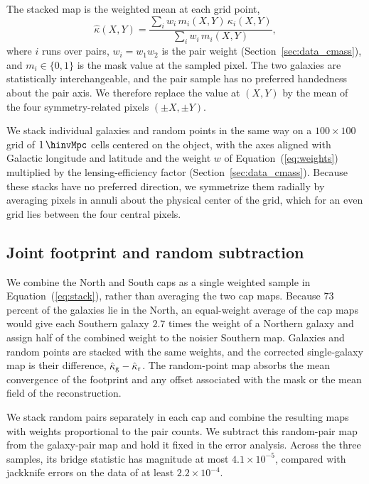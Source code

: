 The stacked map is the weighted mean at each grid point,
\begin{equation}
  \hat\kappa(X,Y) = \frac{\sum_{i} w_{i}\,m_{i}(X,Y)\,\kappa_{i}(X,Y)}
                         {\sum_{i} w_{i}\,m_{i}(X,Y)},
  \label{eq:stack}
\end{equation}
where $i$ runs over pairs, $w_{i}=w_{1}w_{2}$ is the pair weight
(Section~\ref{sec:data_cmass}), and $m_{i}\in\{0,1\}$ is the mask value at
the sampled pixel. The two galaxies are statistically interchangeable, and
the pair sample has no preferred handedness about the pair axis. We therefore
replace the value at $(X,Y)$ by the mean of the four symmetry-related pixels
$(\pm X,\pm Y)$.

We stack individual galaxies and random points in the same way on a
$100\times100$ grid of $1\,\hinvMpc$ cells centered on the object, with the
axes aligned with Galactic longitude and latitude and the weight $w$ of
Equation~(\ref{eq:weights}) multiplied by the lensing-efficiency factor
(Section~\ref{sec:data_cmass}). Because these stacks have no preferred
direction, we symmetrize them radially by averaging pixels in annuli about
the physical center of the grid, which for an even grid lies between the
four central pixels.

\subsection{Joint footprint and random subtraction}
\label{sec:joint}

We combine the North and South caps as a single weighted sample in
Equation~(\ref{eq:stack}), rather than averaging the two cap maps. Because
$73$ percent of the galaxies lie in the North, an equal-weight average of the
cap maps would give each Southern galaxy $2.7$ times the weight of a Northern
galaxy and assign half of the combined weight to the noisier Southern map.
Galaxies and random points are stacked with the same weights, and the
corrected single-galaxy map is their difference,
$\hat\kappa_{\rm g}-\hat\kappa_{\rm r}$. The random-point map absorbs the
mean convergence of the footprint and any offset associated with the mask
or the mean field of the reconstruction.

We stack random pairs separately in each cap and combine the resulting maps
with weights proportional to the pair counts. We subtract this random-pair
map from the galaxy-pair map and hold it fixed in the error analysis. Across
the three samples, its bridge statistic has magnitude at most
$4.1\times10^{-5}$, compared with jackknife errors on the data of at least
$2.2\times10^{-4}$.

